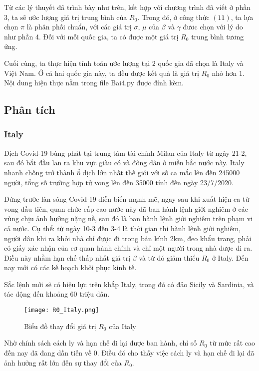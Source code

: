 \documentclass[a4paper]{article}
\begin{document}
Từ các lý thuyết đã trình bày như trên, kết hợp với chương trình đã viết ở phần 3, ta sẽ ước lượng giá trị trung bình của $R_0$. Trong đó, ở công thức $(11)$, ta lựa chọn $\pi$ là phân phối chuẩn, với các giá trị $\sigma$, $\mu$ của $\beta$ và $\gamma$ đươc chọn với lý do như phần 4. Đối với mỗi quốc gia, ta có được một giá trị $R_0$ trung bình tương ứng.

Cuối cùng, ta thực hiện tính toán ước lượng tại 2 quốc gia đã chọn là Italy và Việt Nam. Ở cả hai quốc gia này, ta đều được kết quả là giá trị $R_0$ nhỏ hơn 1. Nội dung hiện thực nằm trong file Bai4.py được đính kèm.
\subsection{Phân tích}
\subsubsection{Italy}
Dịch Covid-19 bùng phát tại trung tâm tài chính Milan của Italy từ ngày 21-2, sau đó bắt đầu lan ra khu vực giàu có và đông dân ở miền bắc nước này. Italy nhanh chống trở thành ổ dịch lớn nhất thế giới với số ca mắc lên đến 245000 người, tổng số trường hợp tử vong lên đến 35000 tính đến ngày 23/7/2020.

Đứng trước làn sóng Covid-19 diễn biến mạnh mẽ, ngay sau khi xuất hiện ca tử vong đầu tiên, quan chức cấp cao nước này đã ban hành lệnh giới nghiêm ở các vùng chịu ảnh hưởng nặng nề, sau đó là ban hành lệnh giới nghiêm trên phạm vi cả nước. Cụ thể: từ ngày 10-3 đến 3-4 là thời gian thi hành lệnh giới nghiêm, người dân khi ra khỏi nhà chỉ được đi trong bán kính 2km, đeo khẩu trang, phải có giấy xác nhận của cơ quan hành chính 
và chỉ một người trong nhà được đi ra. Điều này nhằm hạn chế thấp nhất giá trị $\beta$ và từ đó giảm thiểu $R_0$ ở Italy. Đến nay mới có các kế hoạch khôi phục kinh tế.

Sắc lệnh mới sẽ có hiệu lực trên khắp Italy, trong đó có đảo Sicily và Sardinia, và tác động đến khoảng 60 triệu dân.

\begin{figure}[h!]
    \centering
    \texttt{[image: R0\_Italy.png]}
    \caption{ Biểu đồ thay đổi giá trị $R_0$ của Italy}
\end{figure}

Nhờ chính sách cách ly và hạn chế đi lại được ban hành, chỉ số $R_0$ từ mức rất cao đến nay đã đang dần tiến về 0. Điều đó cho thấy việc cách ly và hạn chế đi lại đã ảnh hưởng rất lớn đến sự thay đổi của $R_0$.
\end{document}
